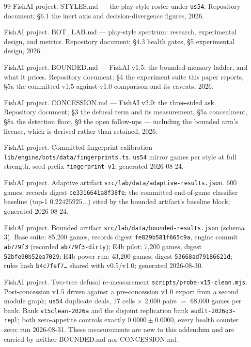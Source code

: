 \documentclass[11pt]{article}
\newcommand{\code}[1]{\texttt{#1}}
\newcommand{\usff}{\code{us54}}
\begin{document}
\begin{thebibliography}{99}
FishAI project.
\newblock STYLES.md --- the play-style roster under \usff{}.
\newblock Repository document; \S6.1 the inert axis and decision-divergence figures,
2026.

FishAI project.
\newblock BOT\_LAB.md --- play-style spectrum: research, experimental design, and
metrics.
\newblock Repository document; \S4.3 health gates, \S5 experimental design, 2026.

FishAI project.
\newblock BOUNDED.md --- FishAI v1.5: the bounded-memory ladder, and what it prices.
\newblock Repository document; \S4 the experiment suite this paper reports, \S5a the committed
v1.5-against-v1.0 comparison and its caveats, 2026.

FishAI project.
\newblock CONCESSION.md --- FishAI v2.0: the three-sided ask.
\newblock Repository document; \S3 the defusal term and its measurement, \S5a concealment,
\S8a the detection floor, \S9 the open follow-ups --- including the bounded arm's licence, which
is derived rather than retained, 2026.

FishAI project.
\newblock Committed fingerprint calibration \code{lib/engine/bots/data/fingerprints.ts}.
 \usff{} mirror games per style at full strength, seed prefix
\code{fingerprint-v1}; generated 2026-08-24.

FishAI project.
\newblock Adaptive artifact \code{src/lab/data/adaptive-results.json}.
600 games; records digest \code{ce3316641a8f38fe}; the committed
end-of-game classifier baseline (top-1 $0.22425925\ldots$) cited by the bounded
artifact's baseline block; generated 2026-08-24.

FishAI project.
\newblock Bounded artifact \code{src/lab/data/bounded-results.json} (schema 3).
\newblock Base suite: 85{,}200 games, records digest \code{fe829b581f665c9a}, engine
commit \code{ab779f3} (recorded \code{ab779f3-dirty}); E4b pilot: 7{,}200 games,
digest \code{52bfe90b52ea7029}; E4b power run: 43{,}200 games, digest
\code{53668ad79186621d}; rules hash \code{b4c7fef7\ldots} shared with v0.5/v1.0;
generated 2026-08-30.

FishAI project.
\newblock Two-tree defusal re-measurement \code{scripts/probe-v15-clean.mjs}.
\newblock Post-concession v1.5 driven against a pre-concession v1.0 export from a second module
graph; \usff{} duplicate deals, 17 cells $\times$ 2{,}000 pairs $=$ 68{,}000 games per bank.
Bank \code{v15clean-2026a} and the disjoint replication bank \code{audit-2026q3-repl}; both
zero-appetite controls exactly $0.0000 \pm 0.0000$, every health counter zero; run 2026-08-31.
These measurements are new to this addendum and are carried by neither BOUNDED.md nor
CONCESSION.md.


\end{thebibliography}
\end{document}
